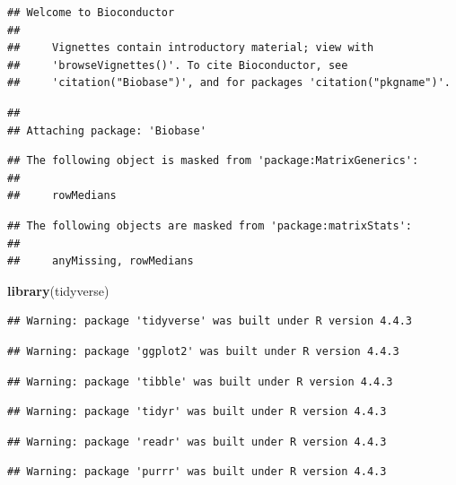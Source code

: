\documentclass[
]{article}
\newenvironment{Shaded}{\begin{snugshade}}{\end{snugshade}}
\newcommand{\FunctionTok}[1]{\textcolor[rgb]{0.13,0.29,0.53}{\textbf{#1}}}
\newcommand{\NormalTok}[1]{#1}
\begin{document}
\begin{verbatim}
## Welcome to Bioconductor
## 
##     Vignettes contain introductory material; view with
##     'browseVignettes()'. To cite Bioconductor, see
##     'citation("Biobase")', and for packages 'citation("pkgname")'.
\end{verbatim}

\begin{verbatim}
## 
## Attaching package: 'Biobase'
\end{verbatim}

\begin{verbatim}
## The following object is masked from 'package:MatrixGenerics':
## 
##     rowMedians
\end{verbatim}

\begin{verbatim}
## The following objects are masked from 'package:matrixStats':
## 
##     anyMissing, rowMedians
\end{verbatim}

\begin{Shaded}
\begin{Highlighting}[]
\FunctionTok{library}\NormalTok{(tidyverse)}
\end{Highlighting}
\end{Shaded}

\begin{verbatim}
## Warning: package 'tidyverse' was built under R version 4.4.3
\end{verbatim}

\begin{verbatim}
## Warning: package 'ggplot2' was built under R version 4.4.3
\end{verbatim}

\begin{verbatim}
## Warning: package 'tibble' was built under R version 4.4.3
\end{verbatim}

\begin{verbatim}
## Warning: package 'tidyr' was built under R version 4.4.3
\end{verbatim}

\begin{verbatim}
## Warning: package 'readr' was built under R version 4.4.3
\end{verbatim}

\begin{verbatim}
## Warning: package 'purrr' was built under R version 4.4.3
\end{verbatim}
\end{document}
